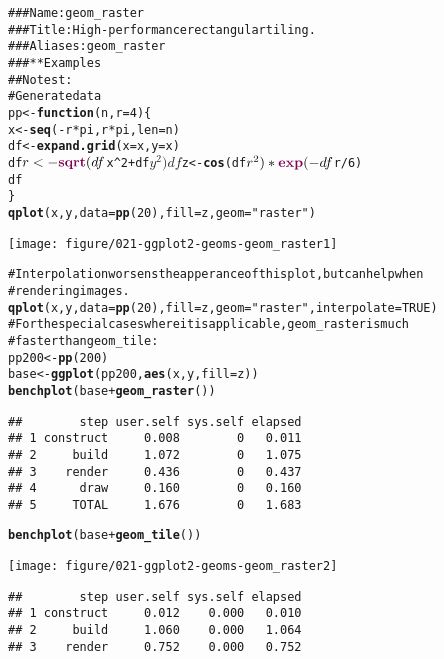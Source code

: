 \documentclass[a4paper,titlepage]{tufte-handout}\usepackage{graphicx, color}
\makeatletter
\def\maxwidth{ %
  \ifdim\Gin@nat@width>\linewidth
    \linewidth
  \else
    \Gin@nat@width
  \fi
}
\newcommand{\hlfunctioncall}[1]{\textcolor[rgb]{0.501960784313725,0,0.329411764705882}{\textbf{#1}}}%
\newcommand{\hlstring}[1]{\textcolor[rgb]{0.6,0.6,1}{#1}}%
\newcommand{\hlcomment}[1]{\textcolor[rgb]{0.180392156862745,0.6,0.341176470588235}{#1}}%
\newenvironment{kframe}{%
 \def\at@end@of@kframe{}%
 \ifinner\ifhmode%
  \def\at@end@of@kframe{\end{minipage}}%
  \begin{minipage}{\columnwidth}%
 \fi\fi%
 \def\FrameCommand##1{\hskip\@totalleftmargin \hskip-\fboxsep
 \colorbox{shadecolor}{##1}\hskip-\fboxsep
     \hskip-\linewidth \hskip-\@totalleftmargin \hskip\columnwidth}%
 \MakeFramed {\advance\hsize-\width
   \@totalleftmargin\z@ \linewidth\hsize
   \@setminipage}}%
 {\par\unskip\endMakeFramed%
 \at@end@of@kframe}
\newenvironment{knitrout}{}{} %
\makeatother
\begin{document}
\begin{knitrout}
\color{fgcolor}\begin{kframe}
\begin{alltt}
\hlcomment{### Name: geom_raster}
\hlcomment{### Title: High-performance rectangular tiling.}
\hlcomment{### Aliases: geom_raster}
\hlcomment{### ** Examples}
\hlcomment{## No test: }
\hlcomment{# Generate data}
pp <- \hlfunctioncall{function} (n,r=4) \{
 x <- \hlfunctioncall{seq}(-r*pi, r*pi, len=n)
 df <- \hlfunctioncall{expand.grid}(x=x, y=x)
 df$r <- \hlfunctioncall{sqrt}(df$x^2 + df$y^2)
 df$z <- \hlfunctioncall{cos}(df$r^2)*\hlfunctioncall{exp}(-df$r/6)
 df
\}
\hlfunctioncall{qplot}(x, y, data = \hlfunctioncall{pp}(20), fill = z, geom = \hlstring{"raster"})
\end{alltt}
\end{kframe}\texttt{[image: figure/021-ggplot2-geoms-geom\_raster1]} \begin{kframe}\begin{alltt}
\hlcomment{# Interpolation worsens the apperance of this plot, but can help when}
\hlcomment{# rendering images.}
\hlfunctioncall{qplot}(x, y, data = \hlfunctioncall{pp}(20), fill = z, geom = \hlstring{"raster"}, interpolate = TRUE)
\hlcomment{# For the special cases where it is applicable, geom_raster is much}
\hlcomment{# faster than geom_tile:}
pp200 <- \hlfunctioncall{pp}(200)
base <- \hlfunctioncall{ggplot}(pp200, \hlfunctioncall{aes}(x, y, fill = z))
\hlfunctioncall{benchplot}(base + \hlfunctioncall{geom_raster}())
\end{alltt}
\begin{verbatim}
##        step user.self sys.self elapsed
## 1 construct     0.008        0   0.011
## 2     build     1.072        0   1.075
## 3    render     0.436        0   0.437
## 4      draw     0.160        0   0.160
## 5     TOTAL     1.676        0   1.683
\end{verbatim}
\begin{alltt}
\hlfunctioncall{benchplot}(base + \hlfunctioncall{geom_tile}())
\end{alltt}
\end{kframe}\texttt{[image: figure/021-ggplot2-geoms-geom\_raster2]} \begin{kframe}\begin{verbatim}
##        step user.self sys.self elapsed
## 1 construct     0.012    0.000   0.010
## 2     build     1.060    0.000   1.064
## 3    render     0.752    0.000   0.752

\end{verbatim}
\end{kframe}
\end{knitrout}
\end{document}
